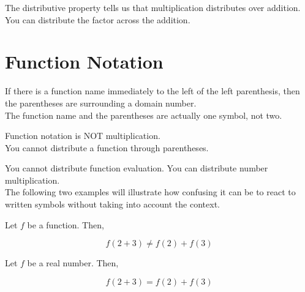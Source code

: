 \documentclass{ximera}
\begin{document}
The distributive property tells us that multiplication distributes over addition.  You can distribute the factor across the addition. \\

















\section{Function Notation}


If there is a function name immediately to the left of the left parenthesis, then the parentheses are surrounding a domain number.   \\


The function name and the parentheses are actually one symbol, not two. \\


\begin{warning}

Function notation is NOT multiplication. \\

You cannot distribute a function through parentheses.


\end{warning}

You cannot distribute function evaluation. You can distribute number multiplication. \\


The following two examples will illustrate how confusing it can be to react to written symbols without taking into account the context.  











\begin{example}


Let $f$ be a function.  Then, 


\[
f(2 + 3) \ne f(2) + f(3)
\]


\end{example}





\begin{example}


Let $f$ be a real number.  Then, 


\[
f(2 + 3) = f(2) + f(3)
\]


\end{example}
\end{document}
